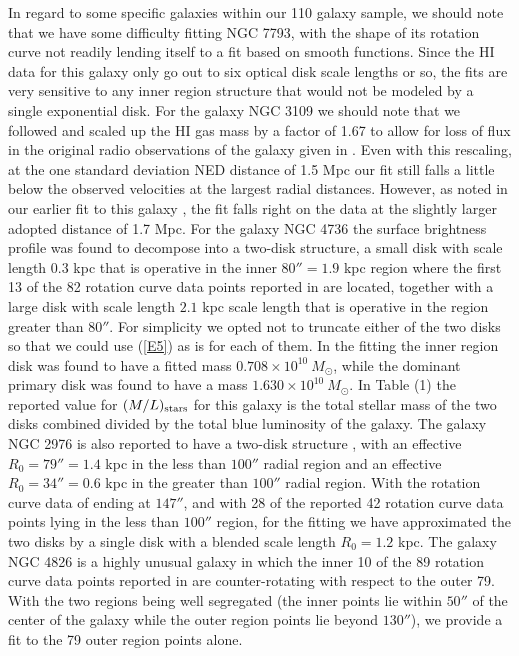 \documentclass[preprint,aps]{revtex4}
\begin{document}
In regard to some specific galaxies within our 110 galaxy sample, we should note that we have some difficulty fitting NGC 7793, with the shape of its rotation curve not readily lending itself to a fit based on smooth functions. Since the HI data for this galaxy only go out to six optical disk scale lengths or so, the fits are very sensitive to any inner region structure that would not be modeled by a single exponential disk. For the galaxy NGC 3109 we should note that we followed \cite{Begeman1991} and scaled up the HI gas mass by a factor of 1.67 to allow for loss of flux in the original radio observations of the galaxy given in  \cite{Jobin1990}. Even with this rescaling, at the one standard deviation NED distance of 1.5 Mpc our fit still falls a little below the observed velocities at the largest radial distances. However, as noted in our earlier fit to this galaxy \cite{Mannheim1997}, the fit falls right on the data at the slightly larger adopted distance of 1.7 Mpc. For the galaxy NGC 4736 the surface brightness profile was found \cite{deBlok2008} to decompose into a two-disk structure, a small disk with scale length $0.3$ kpc  that is operative in the inner $80''=1.9$ kpc region where the first 13 of the 82 rotation curve data points reported in \cite{deBlok2008} are located, together with a large disk with scale length $2.1$ kpc scale length that is operative in the region greater than $80''$. For simplicity we opted not to truncate either of the two disks so that we could use (\ref{E5}) as is for each of them. In the fitting the inner region disk was found to have a fitted mass $0.708\times 10^{10}~M_{\odot}$, while the dominant primary disk was found to have a mass $1.630 \times 10^{10}~M_{\odot}$. In Table (1) the reported value for $(M/L)_{\rm stars}$ for this galaxy is the total stellar mass of the two disks combined divided by the total blue luminosity of the galaxy. The galaxy NGC 2976 is also reported to have a two-disk structure \cite{Simon2003}, with an effective $R_0=79''=1.4$ kpc in the less than $100''$ radial region and an effective $R_0=34''=0.6$ kpc in the greater than $100''$ radial region. With the rotation curve data of \cite{deBlok2008} ending at $147''$, and with  28 of the reported 42 rotation curve data points lying in the less than $100''$ region, for the fitting we have approximated the two disks by a single disk with a blended scale length $R_0=1.2$ kpc. The galaxy NGC 4826 is a highly unusual galaxy in which the inner 10 of the 89 rotation curve data points reported in \cite{deBlok2008} are counter-rotating with respect to the outer 79. With the two regions being well segregated (the inner points lie within $50''$ of the center of the galaxy while the outer region points lie beyond $130''$), we provide a fit to the 79 outer region points alone.
\end{document}
